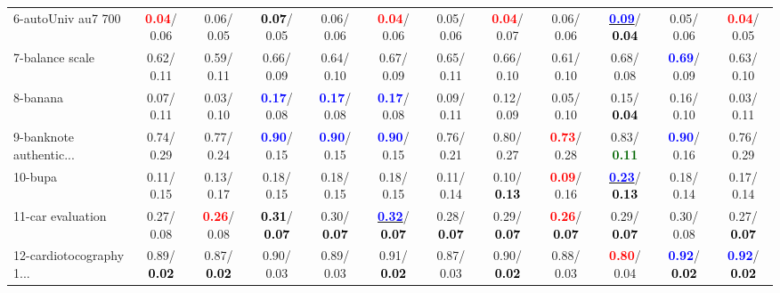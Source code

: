 \begin{table}[h]
\begin{center}
{\begin{tabular}{lc|c|c|c|c|c|c|c|c|c|c}
6-autoUniv au7 700 & \textcolor{red}{\textbf{  0.04}}/  0.06 &   0.06/  0.05 & \textcolor{black}{\textbf{  0.07}}/  0.05 &   0.06/  0.06 & \textcolor{red}{\textbf{  0.04}}/  0.06 &   0.05/  0.06 & \textcolor{red}{\textbf{  0.04}}/  0.07 &   0.06/  0.06 & \underline{\textcolor{blue}{\textbf{  0.09}}}/\textcolor{black}{\textbf{  0.04}} &   0.05/  0.06 & \textcolor{red}{\textbf{  0.04}}/  0.05 \\
7-balance scale &   0.62/  0.11 &   0.59/  0.11 &   0.66/  0.09 &   0.64/  0.10 &   0.67/  0.09 &   0.65/  0.11 &   0.66/  0.10 &   0.61/  0.10 &   0.68/  0.08 & \textcolor{blue}{\textbf{  0.69}}/  0.09 &   0.63/  0.10 \\ \hline
8-banana &   0.07/  0.11 &   0.03/  0.10 & \textcolor{blue}{\textbf{  0.17}}/  0.08 & \textcolor{blue}{\textbf{  0.17}}/  0.08 & \textcolor{blue}{\textbf{  0.17}}/  0.08 &   0.09/  0.11 &   0.12/  0.09 &   0.05/  0.10 &   0.15/\textcolor{black}{\textbf{  0.04}} &   0.16/  0.10 &   0.03/  0.11 \\
9-banknote authentic... &   0.74/  0.29 &   0.77/  0.24 & \textcolor{blue}{\textbf{  0.90}}/  0.15 & \textcolor{blue}{\textbf{  0.90}}/  0.15 & \textcolor{blue}{\textbf{  0.90}}/  0.15 &   0.76/  0.21 &   0.80/  0.27 & \textcolor{red}{\textbf{  0.73}}/  0.28 &   0.83/\textcolor{darkgreen}{\textbf{  0.11}} & \textcolor{blue}{\textbf{  0.90}}/  0.16 &   0.76/  0.29 \\
10-bupa &   0.11/  0.15 &   0.13/  0.17 &   0.18/  0.15 &   0.18/  0.15 &   0.18/  0.15 &   0.11/  0.14 &   0.10/\textcolor{black}{\textbf{  0.13}} & \textcolor{red}{\textbf{  0.09}}/  0.16 & \underline{\textcolor{blue}{\textbf{  0.23}}}/\textcolor{black}{\textbf{  0.13}} &   0.18/  0.14 &   0.17/  0.14 \\
11-car evaluation &   0.27/  0.08 & \textcolor{red}{\textbf{  0.26}}/  0.08 & \textcolor{black}{\textbf{  0.31}}/\textcolor{black}{\textbf{  0.07}} &   0.30/\textcolor{black}{\textbf{  0.07}} & \underline{\textcolor{blue}{\textbf{  0.32}}}/\textcolor{black}{\textbf{  0.07}} &   0.28/\textcolor{black}{\textbf{  0.07}} &   0.29/\textcolor{black}{\textbf{  0.07}} & \textcolor{red}{\textbf{  0.26}}/\textcolor{black}{\textbf{  0.07}} &   0.29/\textcolor{black}{\textbf{  0.07}} &   0.30/  0.08 &   0.27/\textcolor{black}{\textbf{  0.07}} \\
12-cardiotocography 1... &   0.89/\textcolor{black}{\textbf{  0.02}} &   0.87/\textcolor{black}{\textbf{  0.02}} &   0.90/  0.03 &   0.89/  0.03 &   0.91/\textcolor{black}{\textbf{  0.02}} &   0.87/  0.03 &   0.90/\textcolor{black}{\textbf{  0.02}} &   0.88/  0.03 & \textcolor{red}{\textbf{  0.80}}/  0.04 & \textcolor{blue}{\textbf{  0.92}}/\textcolor{black}{\textbf{  0.02}} & \textcolor{blue}{\textbf{  0.92}}/\textcolor{black}{\textbf{  0.02}} \\

\end{tabular}}
\end{center}
\end{table}
